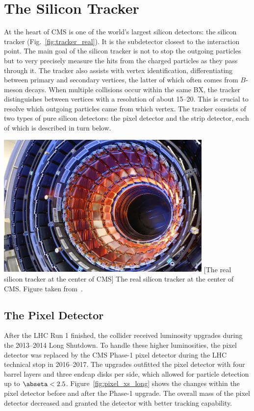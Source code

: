 \section{The Silicon Tracker}
\label{sec:tracker}
At the heart of CMS is one of the world's largest silicon detectors: the silicon tracker (Fig.~\ref{fig:tracker_real}).
It is the subdetector closest to the \pp interaction point.
The main goal of the silicon tracker is not to stop the outgoing particles but to very precisely measure the hits from the charged particles as they pass through it.
The tracker also assists with vertex identification, differentiating between primary and secondary vertices, the latter of which often comes from $B$-meson decays.
When multiple \pp collisions occur within the same BX, the tracker distinguishes between \pp vertices with a resolution of about 15--20\mum.
This is crucial to resolve which outgoing particles came from which \pp vertex.
The tracker consists of two types of pure silicon detectors: the pixel detector and the strip detector, each of which is described in turn below.
\begin{multiFigure}
    \centering
        \includegraphics[width=0.8\textwidth]{figures/cms/tracker/silicon_tracker_real.jpg}
        [The real silicon tracker at the center of CMS]
        {The real silicon tracker at the center of CMS. Figure taken from~\cite{tracker_real}.}
    \label{fig:tracker_real}
\end{multiFigure}

\subsection{The Pixel Detector}
\label{sec:pixel}
After the LHC Run 1 finished, the collider received luminosity upgrades during the 2013--2014 Long Shutdown.
To handle these higher luminosities, the pixel detector was replaced by the CMS Phase-1 pixel detector during the LHC technical stop in 2016--2017.
The upgrades outfitted the pixel detector with four barrel layers and three endcap disks per side, which allowed for particle detection up to $\abseta < 2.5$.
Figure~\ref{fig:pixel_xs_long} shows the changes within the pixel detector before and after the Phase-1 upgrade.
The overall mass of the pixel detector decreased and granted the detector with better tracking capability.

